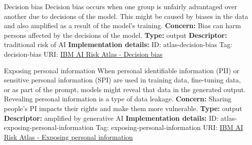 \begin{definitionbox}{Decision bias}
Decision bias occurs when one group is unfairly advantaged over another due to decisions of the model. This might be caused by biases in the data and also amplified as a result of the model's training.\newline\newline
\textbf{Concern: }Bias can harm persons affected by the decisions of the model.\newline\newline
\textbf{Type: }output\newline
\textbf{Descriptor: }traditional risk of AI \newline\newline
\textbf{Implementation details: } \newline
ID: atlas-decision-bias \newline
Tag: decision-bias \newline
URI:  \href{https://www.ibm.com/docs/en/watsonx/saas?topic=SSYOK8/wsj/ai-risk-atlas/decision-bias.html}{IBM AI Risk Atlas - Decision bias}\newline
\end{definitionbox}
\begin{definitionbox}{Exposing personal information}
When personal identifiable information (PII) or sensitive personal information (SPI) are used in training data, fine-tuning data, or as part of the prompt, models might reveal that data in the generated output. Revealing personal information is a type of data leakage.\newline\newline
\textbf{Concern: }Sharing people's PI impacts their rights and make them more vulnerable.\newline\newline
\textbf{Type: }output\newline
\textbf{Descriptor: }amplified by generative AI \newline\newline
\textbf{Implementation details: } \newline
ID: atlas-exposing-personal-information \newline
Tag: exposing-personal-information \newline
URI:  \href{https://www.ibm.com/docs/en/watsonx/saas?topic=SSYOK8/wsj/ai-risk-atlas/exposing-personal-information.html}{IBM AI Risk Atlas - Exposing personal information}\newline
\end{definitionbox}
